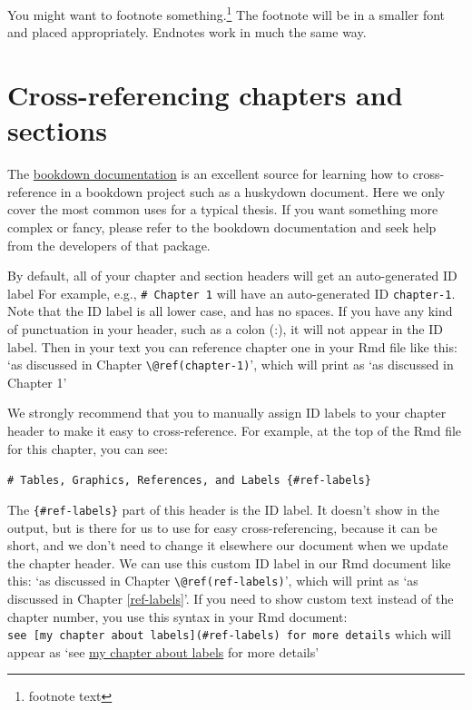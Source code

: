 \documentclass [11pt, proquest] {uwthesis}[2015/03/03]
\begin{document}
You might want to footnote something.\footnote{footnote text} The
footnote will be in a smaller font and placed appropriately. Endnotes
work in much the same way.

\section{Cross-referencing chapters and
sections}\label{cross-referencing-chapters-and-sections}

The
\href{https://bookdown.org/yihui/bookdown/cross-references.html}{bookdown
documentation} is an excellent source for learning how to
cross-reference in a bookdown project such as a huskydown document. Here
we only cover the most common uses for a typical thesis. If you want
something more complex or fancy, please refer to the bookdown
documentation and seek help from the developers of that package.

By default, all of your chapter and section headers will get an
auto-generated ID label For example, e.g., \texttt{\#\ Chapter\ 1} will
have an auto-generated ID \texttt{chapter-1}. Note that the ID label is
all lower case, and has no spaces. If you have any kind of punctuation
in your header, such as a colon (:), it will not appear in the ID label.
Then in your text you can reference chapter one in your Rmd file like
this: `as discussed in Chapter
\texttt{\textbackslash{}@ref(chapter-1)}', which will print as `as
discussed in Chapter 1'

We strongly recommend that you to manually assign ID labels to your
chapter header to make it easy to cross-reference. For example, at the
top of the Rmd file for this chapter, you can see:

\texttt{\#\ Tables,\ Graphics,\ References,\ and\ Labels\ \{\#ref-labels\}}

The \texttt{\{\#ref-labels\}} part of this header is the ID label. It
doesn't show in the output, but is there for us to use for easy
cross-referencing, because it can be short, and we don't need to change
it elsewhere our document when we update the chapter header. We can use
this custom ID label in our Rmd document like this: `as discussed in
Chapter \texttt{\textbackslash{}@ref(ref-labels)}', which will print as
`as discussed in Chapter \ref{ref-labels}'. If you need to show custom
text instead of the chapter number, you use this syntax in your Rmd
document:
\texttt{see\ {[}my\ chapter\ about\ labels{]}(\#ref-labels)\ for\ more\ details}
which will appear as `see \protect\hyperlink{ref-labels}{my chapter
about labels} for more details'
\end{document}

